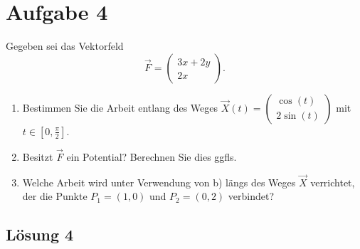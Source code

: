 \documentclass[main.tex]{subfiles}
\begin{document}
\section{Aufgabe 4}
Gegeben sei das Vektorfeld
\[
\vec{F} 
= \begin{pmatrix}
	3x + 2y \\
	2x
\end{pmatrix}.
\]
\begin{enumerate}
\item Bestimmen Sie die Arbeit entlang des Weges 
$\vec{X}(t) 
= \begin{pmatrix}
	\cos(t) \\ 
	2\sin(t)
  \end{pmatrix}$
mit $t \in \left[ 0, \frac{\pi}{2}\right]$.
\item Besitzt $\vec{F}$ ein Potential? Berechnen Sie dies ggfls. 
\item Welche Arbeit wird unter Verwendung von b) längs des Weges $\vec{X}$ verrichtet, der die Punkte $P_1 = (1,0)$ und $P_2 = (0,2)$ verbindet? 
\end{enumerate}

\subsection{Lösung 4}
\end{document}
